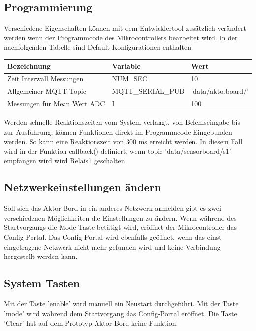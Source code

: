 \subsection{Programmierung}
Verschiedene Eigenschaften können mit dem Entwicklertool zusätzlich verändert werden wenn der Programmcode des Mikrocontrollers bearbeitet wird. In der nachfolgenden Tabelle sind Default-Konfigurationen enthalten.
\begin{table}[H]
\centering
\begin{tabular}{|l|l|l|}
	\hline 
	Bezeichnung & Variable & Wert \\ 
	\hline 
	Zeit Interwall Messungen & NUM\_SEC & 10 \\ 
	\hline 
	Allgemeiner MQTT-Topic  & MQTT\_SERIAL\_PUB & 'data/aktorboard/' \\ 
	\hline 
	Messungen für Mean Wert ADC & I & 100 \\ 
	\hline  
\end{tabular} 	
\end{table}
Werden schnelle Reaktionszeiten vom System verlangt, von Befehlseingabe bis zur Ausführung, können Funktionen direkt im Programmcode Eingebunden werden. So kann eine Reaktionszeit von 300 ms erreicht werden. In diesem Fall wird in der Funktion callback() definiert, wenn topic 'data/sensorboard/s1' empfangen wird wird Relais1 geschalten.
\subsection{Netzwerkeinstellungen ändern}
Soll sich das Aktor Bord in ein anderes Netzwerk anmelden gibt es zwei verschiedenen Möglichkeiten die Einstellungen zu ändern. Wenn während des Startvorgangs die Mode Taste betätigt wird, eröffnet der Mikrocontroller das Config-Portal. Das Config-Portal wird ebenfalls geöffnet, wenn das einst eingetragene Netzwerk nicht mehr gefunden wird und keine Verbindung hergestellt werden kann.
\subsection{System Tasten}
Mit der Taste 'enable' wird manuell ein Neustart durchgeführt. Mit der Taste 'mode' wird während dem Startvorgang das Config-Portal eröffnet. Die Taste 'Clear' hat auf dem Prototyp Aktor-Bord keine Funktion.

